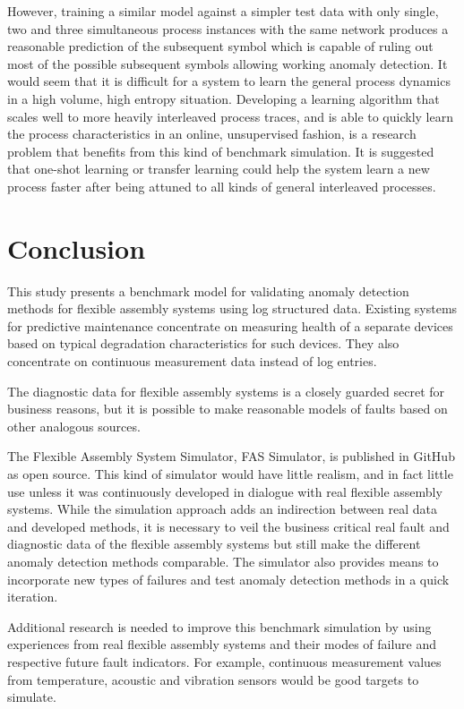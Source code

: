 \documentclass[journal]{IEEEtran}
\begin{document}
However, training a similar model against a simpler test data with only single, two and three simultaneous process instances with the same network produces a reasonable
prediction of the subsequent symbol which is capable of ruling out most of the possible subsequent symbols allowing working anomaly detection.
It would seem that it is difficult for a system to learn the general process dynamics in a high volume, high entropy situation.
Developing a learning algorithm that scales well to more heavily interleaved process traces, and is able to quickly learn the process characteristics in an online,
unsupervised fashion, is a research problem that benefits from this kind of benchmark simulation. It is suggested that one-shot learning or transfer learning could help the system learn a new process
faster after being attuned to all kinds of general interleaved processes.

\section{Conclusion}

This study presents a benchmark model for validating anomaly detection methods for flexible assembly systems using log structured data.
Existing systems for predictive maintenance concentrate on measuring health of a separate devices based on typical degradation characteristics
for such devices. They also concentrate on continuous measurement data instead of log entries.

The diagnostic data for flexible assembly systems is a closely guarded secret for business reasons, but it is possible to make reasonable models
of faults based on other analogous sources.

The Flexible Assembly System Simulator, FAS Simulator, is published in GitHub \cite{FASSimulator} as open source. This kind of simulator would have
little realism, and in fact little use unless it was continuously developed in dialogue with real flexible assembly systems. While the simulation
approach adds an indirection between real data and developed methods, it is necessary to veil the business critical real fault and diagnostic
data of the flexible assembly systems but still make the different anomaly detection methods comparable. The simulator also provides means to incorporate new types of
failures and test anomaly detection methods in a quick iteration.

Additional research is needed to improve this benchmark simulation by using experiences from real flexible assembly systems and their modes of failure
and respective future fault indicators. For example, continuous measurement values from temperature, acoustic and vibration sensors would be good targets
to simulate.
\end{document}
